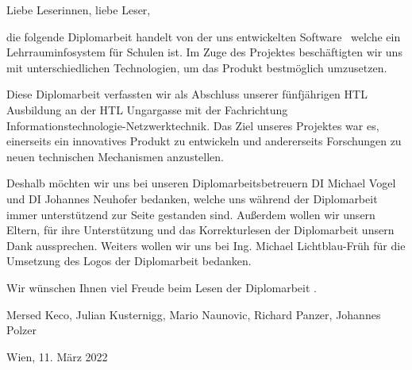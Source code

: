 
Liebe Leserinnen, liebe Leser,

die folgende Diplomarbeit handelt von der uns entwickelten Software \ZELIA\, welche ein Lehrrauminfosystem für Schulen ist. Im Zuge des Projektes beschäftigten wir uns mit unterschiedlichen Technologien, um das Produkt bestmöglich umzusetzen.

Diese Diplomarbeit verfassten wir als Abschluss unserer fünfjährigen HTL Ausbildung an der HTL Ungargasse mit der Fachrichtung Informationstechnologie-Netzwerktechnik. Das Ziel unseres Projektes war es, einerseits ein innovatives Produkt zu entwickeln und andererseits Forschungen zu neuen technischen Mechanismen anzustellen.

Deshalb möchten wir uns bei unseren Diplomarbeitsbetreuern DI Michael Vogel und DI Johannes Neuhofer bedanken, welche uns während der Diplomarbeit immer unterstützend zur Seite gestanden sind. Außerdem wollen wir unsern Eltern, für ihre Unterstützung und das Korrekturlesen der Diplomarbeit unsern Dank aussprechen. Weiters wollen wir uns bei Ing. Michael Lichtblau-Früh für die Umsetzung des Logos der Diplomarbeit bedanken.

Wir wünschen Ihnen viel Freude beim Lesen der Diplomarbeit \ZELIA.

Mersed Keco, Julian Kusternigg, Mario Naunovic, Richard Panzer, Johannes Polzer

Wien, 11. März 2022
